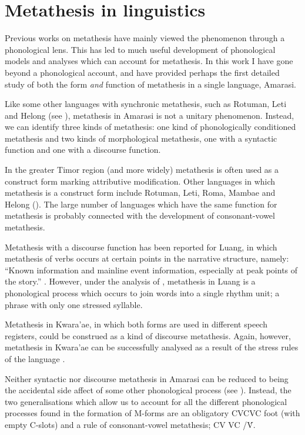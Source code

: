 \section{Metathesis in linguistics}\label{sec:MetLin}
Previous works on metathesis have mainly viewed the phenomenon through a phonological lens.
This has led to much useful development of phonological
models and analyses which can account for metathesis.
In this work I have gone beyond a phonological account,
and have provided perhaps the first detailed study of both the form
\emph{and} function of metathesis in a single language, Amarasi.

Like some other languages with synchronic metathesis,
such as Rotuman, Leti and Helong (see ),
metathesis in Amarasi is not a unitary phenomenon.
Instead, we can identify three kinds of metathesis:
one kind of phonologically conditioned metathesis and two
kinds of morphological metathesis, one with a syntactic
function and one with a discourse function.

In the greater Timor region (and more widely) metathesis is
often used as a construct form marking attributive modification.
Other languages in which metathesis is a construct form
include Rotuman, Leti, Roma, Mambae and Helong  ().
The large number of languages which have the same function for metathesis
is probably connected with the development of consonant-vowel metathesis.

Metathesis with a discourse function has been
reported for Luang, in which metathesis of verbs
occurs at certain points in the narrative structure, namely:
``Known information and mainline event information, especially at peak points of the story.'' \cite[24]{tata15}.
However, under the analysis of \cite{tata15}, metathesis
in Luang is a phonological process which occurs
to join words into a single rhythm unit;
a phrase with only one stressed syllable.

Metathesis in Kwara'ae, in which both forms
are used in different speech registers,
could be construed as a kind of discourse metathesis.
Again, however, metathesis in Kwara'ae can be successfully analysed
as a result of the stress rules of the language \citep{he04}.

Neither syntactic nor discourse metathesis
in Amarasi can be reduced to being the accidental side affect of some other
phonological process (see ).
Instead, the two generalisations which allow
us to account for all the different phonological processes
found in the formation of M-forms
are an obligatory CVCVC foot (with empty C-slots)
and a rule of consonant-vowel metathesis; CV {\ra} VC /\'V{\gap}.

